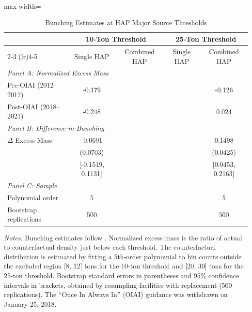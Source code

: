 \begin{table}[H]
\centering
\caption{Bunching Estimates at HAP Major Source Thresholds}
\label{tab:bunching}
\begin{threeparttable}
\small
\begin{adjustbox}{max width=\textwidth}
\begin{tabular}{lcccc}
\toprule
 & \multicolumn{2}{c}{10-Ton Threshold} & \multicolumn{2}{c}{25-Ton Threshold} \\
\cmidrule(lr){2-3} \cmidrule(lr){4-5}
 & Single HAP & Combined HAP & Single HAP & Combined HAP \\
\midrule
\multicolumn{5}{l}{\textit{Panel A: Normalized Excess Mass}} \\
Pre-OIAI (2012--2017) & -0.179 & & & -0.126 \\
Post-OIAI (2018--2021) & -0.248 & & & 0.024 \\
\midrule
\multicolumn{5}{l}{\textit{Panel B: Difference-in-Bunching}} \\
$\Delta$ Excess Mass & -0.0691 & & & 0.1498 \\
 & (0.0703) & & & (0.0425) \\
 & [-0.1519, 0.1131] & & & [0.0453, 0.2163] \\
\midrule
\multicolumn{5}{l}{\textit{Panel C: Sample}} \\
Polynomial order & 5 & & & 5 \\
Bootstrap replications & 500 & & & 500 \\
\bottomrule
\end{tabular}
\end{adjustbox}
\begin{tablenotes}[flushleft]
\small
\item \textit{Notes:} Bunching estimates follow \citet{Kleven2016}. Normalized excess mass is the ratio of actual to counterfactual density just below each threshold. The counterfactual distribution is estimated by fitting a 5th-order polynomial to bin counts outside the excluded region [8, 12] tons for the 10-ton threshold and [20, 30] tons for the 25-ton threshold. Bootstrap standard errors in parentheses and 95\% confidence intervals in brackets, obtained by resampling facilities with replacement (500 replications). The ``Once In Always In'' (OIAI) guidance was withdrawn on January 25, 2018.
\end{tablenotes}
\end{threeparttable}
\end{table}

